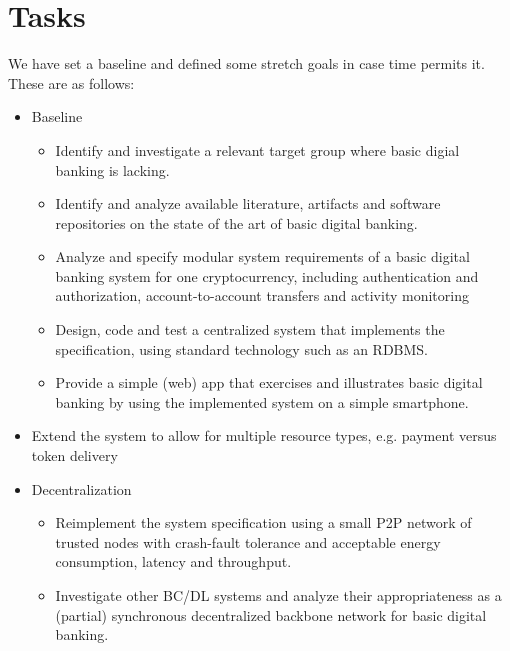 \documentclass[12pt]{article}
\begin{document}
\section{Tasks}
We have set a baseline and defined some stretch goals in case time permits it. These are as follows:
\begin{itemize}
    \item Baseline
    \begin{itemize}
        \item Identify and investigate a relevant target group where basic digial banking is lacking.
        \item Identify and analyze available literature, artifacts and software repositories on the state of the art of basic digital banking.
        \item Analyze and specify modular system requirements of a basic digital banking system for one cryptocurrency, including authentication and authorization, account-to-account transfers and activity monitoring
        \item Design, code and test a centralized system that implements the specification, using standard technology such as an RDBMS.
        \item Provide a simple (web) app that exercises and illustrates basic digital banking by using the implemented system on a simple smartphone.
    \end{itemize}
    \item Extend the system to allow for multiple resource types, e.g. payment versus token delivery
    \item Decentralization
    \begin{itemize}
        \item Reimplement the system specification using a small P2P network of trusted nodes with crash-fault tolerance and acceptable energy consumption, latency and throughput.
        \item Investigate other BC/DL systems and analyze their appropriateness as a (partial) synchronous decentralized backbone network for basic digital banking.
    \end{itemize}
\end{itemize}
\end{document}
